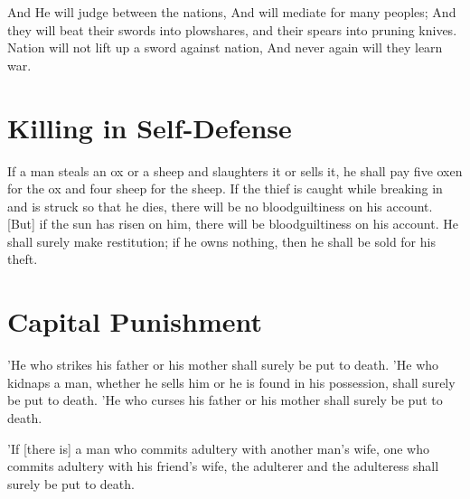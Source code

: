 \vspace{2\baselineskip}
\begin{scripture}[Isaiah 2:4]
    And He will judge between the nations,
    And will mediate for many peoples;
    And they will beat their swords into plowshares, and their spears into pruning knives.
    Nation will not lift up a sword against nation,
    And never again will they learn war.
\end{scripture}

\vspace{4\baselineskip}


\section{Killing in Self-Defense}
\begin{scripture}[Exodus 22:1-3]
    If a man steals an ox or a sheep and slaughters it or sells it, he shall pay five oxen for the ox and four sheep for the sheep.
    If the thief is caught while breaking in and is struck so that he dies, there will be no bloodguiltiness on his account.
    [But] if the sun has risen on him, there will be bloodguiltiness on his account. He shall surely make restitution; if he owns nothing, then he shall be sold for his theft.
\end{scripture}

\newpage
\section{Capital Punishment}
\begin{scripture}[Exodus 21:15-17]
    'He who strikes his father or his mother shall surely be put to death.
    'He who kidnaps a man, whether he sells him or he is found in his possession, shall surely be put to death.
    'He who curses his father or his mother shall surely be put to death.
\end{scripture}

\vspace{2\baselineskip}

\begin{scripture}[Leviticus 20:10]
    'If [there is] a man who commits adultery with another man's wife, one who commits adultery with his friend's wife, the adulterer and the adulteress shall surely be put to death.
\end{scripture}

